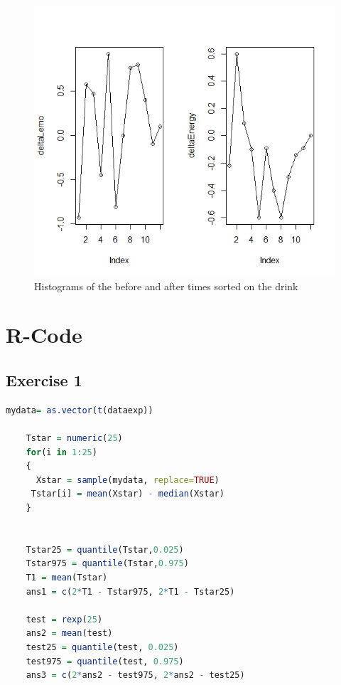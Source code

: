 \documentclass{article}
\begin{document}
    \begin{figure}
      \includegraphics[scale=0.3]{../results/LineLemoEnergy.png}
      \caption{Histograms of the before and after times sorted on the drink}
      \label{fig:LineRunDrink}
    \end{figure}


  \section{R-Code}
    \subsection{Exercise 1}\label{sec:RE1}
      \begin{lstlisting}[language=R]
      mydata= as.vector(t(dataexp))

	Tstar = numeric(25)
	for(i in 1:25)
	{
	  Xstar = sample(mydata, replace=TRUE)
 	 Tstar[i] = mean(Xstar) - median(Xstar)
	}


	Tstar25 = quantile(Tstar,0.025)
	Tstar975 = quantile(Tstar,0.975)
	T1 = mean(Tstar)
	ans1 = c(2*T1 - Tstar975, 2*T1 - Tstar25)

	test = rexp(25)
	ans2 = mean(test)
	test25 = quantile(test, 0.025)
	test975 = quantile(test, 0.975)
	ans3 = c(2*ans2 - test975, 2*ans2 - test25)
      \end{lstlisting}
\end{document}
